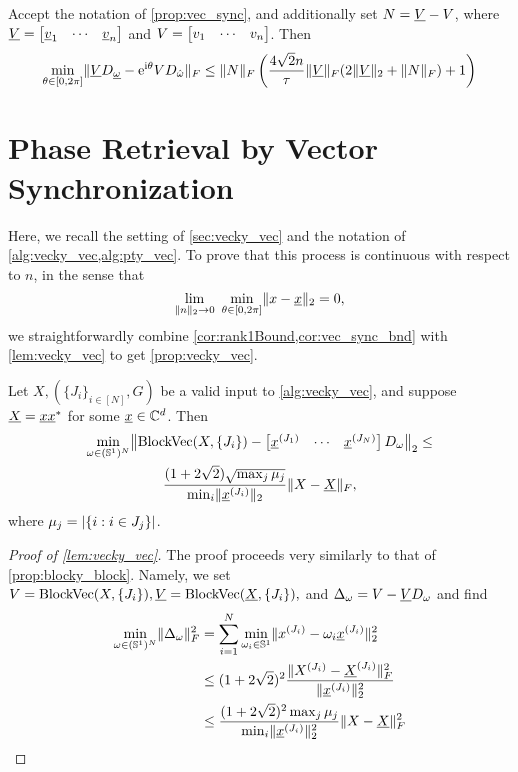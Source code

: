 \begin{corollary} \label{cor:vec_sync_bnd}
  Accept the notation of \cref{prop:vec_sync}, and additionally set $N = \underline{V} - V$, where $\underline{V} = \begin{bmatrix} \underline{v}_{1} & \cdots & \underline{v}_{n} \end{bmatrix}$ and $V = \begin{bmatrix} v_{1} & \cdots & v_{n} \end{bmatrix}$.  Then \begin{equation} \min_{\theta \in [0, 2\pi]} \lVert\underline{V} D_{\underline{\omega}} - \mathrm{e}^{\mathrm{i} \theta} V D_{\hat{\omega}}\rVert_F \le  \lVert N\rVert_F \left(\dfrac{4 \sqrt{2} n}{\tau} \lVert\underline{V}\rVert_F (2 \lVert\underline{V}\rVert_2 + \lVert N\rVert_F) + 1\right) \label{eq:vec_sync_bnd} \end{equation}
\end{corollary}

\section{Phase Retrieval by Vector Synchronization}
\label{app:vecky_vec}
Here, we recall the setting of \cref{sec:vecky_vec} and the notation of \cref{alg:vecky_vec,alg:pty_vec}.  To prove that this process is continuous with respect to $n$, in the sense that \[\lim_{\norm{n}_2 \to 0} \ \mintheta \norm{x - \ux}_2 = 0,\] we straightforwardly combine \cref{cor:rank1Bound,cor:vec_sync_bnd} with \cref{lem:vecky_vec} to get \cref{prop:vecky_vec}.

\begin{lemma} \label{lem:vecky_vec}
  Let $X, (\{J_i\}_{i \in [N]}, G)$ be a valid input to \cref{alg:vecky_vec}, and suppose $\underline{X} = \underline{x} \underline{x}^*$ for some $\underline{x} \in \mathbb{C}^d$.  Then \begin{equation}\begin{gathered}\min_{\omega \in (\Sbb^1)^N} \norm*{\BlkVec(X, \{J_i\}) - \rowmatfl{\ux^{(J_1)}}{\ux^{(J_N)}} D_\omega}_2 \le \\ \dfrac{(1 + 2 \sqrt{2}) \sqrt{\max_j \mu_j}}{\min_i \norm{\ux^{(J_i)}}_2} \norm{X - \uX}_F,\end{gathered} \label{eq:vecky_vec_diff} \end{equation} where $\mu_j = \lvert\{i : i \in J_j\}\rvert$.
\end{lemma}

\begin{proof}[Proof of \cref{lem:vecky_vec}]
  The proof proceeds very similarly to that of \cref{prop:blocky_block}.  Namely, we set $V = \operatorname{BlockVec}(X, \{J_i\}), \underline{V} = \operatorname{BlockVec}(\underline{X}, \{J_i\}),$ and $\Delta_\omega = V - \underline{V} D_\omega$ and find
  \begin{align*}
    \min_{\omega \in (\mathbb{S}^1)^N} \lVert\Delta_\omega\rVert_F^2 &= \sum_{i = 1}^N \min_{\omega_i \in \mathbb{S}^1} \lVert x^{(J_i)} - \omega_i \underline{x}^{(J_i)}\rVert_2^2 \\
    &\le (1 + 2 \sqrt{2})^2 \dfrac{\lVert X^{(J_i)} - \underline{X}^{(J_i)}\rVert_F^2}{\lVert\underline{x}^{(J_i)}\rVert_2^2} \\
    &\le \frac{(1 + 2 \sqrt{2})^2 \max_j \mu_j}{\min_i \lVert\underline{x}^{(J_i)}\rVert_2^2} \lVert X - \underline{X}\rVert_F^2
  \end{align*}  
\end{proof}

